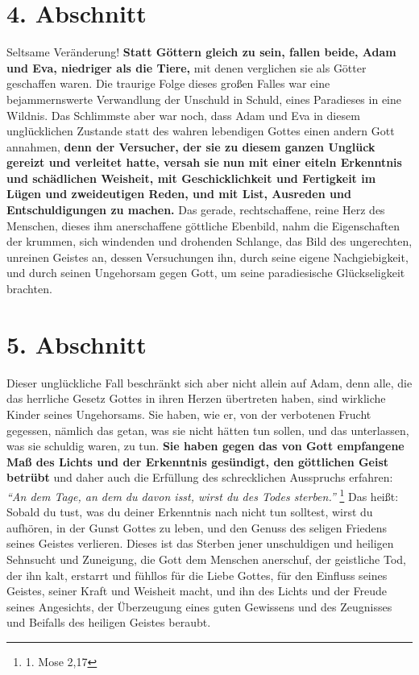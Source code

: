 \section{4. Abschnitt} \label{kap7_ab4}

Seltsame Veränderung! \textbf{Statt Göttern gleich zu sein, fallen beide, Adam
und Eva, 
niedriger als die Tiere,} mit denen verglichen sie als Götter geschaffen waren.
Die traurige Folge dieses großen Falles war eine bejammernswerte Verwandlung
der Unschuld in Schuld, eines Paradieses in eine Wildnis. Das
Schlimmste aber
war noch, dass Adam und Eva in diesem unglücklichen Zustande statt des wahren
lebendigen Gottes einen andern Gott annahmen, \textbf{denn der
Versucher, der sie zu
diesem ganzen Unglück gereizt und verleitet hatte, versah sie nun mit einer
eiteln Erkenntnis und schädlichen
Weisheit, mit Geschicklichkeit und
Fertigkeit
im Lügen und zweideutigen Reden, und mit
List, Ausreden und Entschuldigungen zu
machen.} Das gerade, rechtschaffene, reine Herz des Menschen, dieses ihm
anerschaffene göttliche Ebenbild, nahm die Eigenschaften der krummen, sich
windenden und drohenden Schlange, das Bild des
ungerechten, unreinen Geistes an,
dessen Versuchungen ihn, durch seine eigene Nachgiebigkeit, und durch seinen
Ungehorsam gegen Gott, um seine paradiesische
Glückseligkeit brachten.

\section{5. Abschnitt} \label{kap7_ab5}

Dieser unglückliche Fall beschränkt sich aber nicht allein auf Adam, denn alle,
die das herrliche Gesetz Gottes in ihren Herzen übertreten haben, sind wirkliche
Kinder seines Ungehorsams. Sie haben, wie er, von der verbotenen
Frucht
gegessen, nämlich das getan, was sie nicht hätten tun sollen, und das
unterlassen, was sie schuldig waren, zu tun. \textbf{Sie haben gegen das von
Gott
empfangene Maß des Lichts und der Erkenntnis gesündigt, den göttlichen Geist
betrübt} und daher auch die Erfüllung des schrecklichen Ausspruchs erfahren:
\textit{"`An dem Tage, an dem du davon isst, wirst du des Todes sterben."'}
\footnote{1. Mose 2,17}
Das heißt: Sobald du tust, was du deiner Erkenntnis nach nicht tun
solltest, wirst du aufhören, in der Gunst Gottes zu
leben, und den Genuss des
seligen Friedens seines Geistes verlieren. Dieses ist das
Sterben jener
unschuldigen und heiligen Sehnsucht und Zuneigung, die Gott dem Menschen
anerschuf, der geistliche Tod, der ihn kalt, erstarrt und
fühllos für die Liebe
Gottes, für den Einfluss seines Geistes, seiner Kraft und
Weisheit macht, und ihn
des Lichts und der Freude seines Angesichts, der Überzeugung eines guten
Gewissens und des Zeugnisses und Beifalls des heiligen Geistes beraubt.

